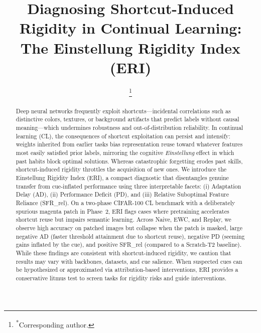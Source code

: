 \documentclass[conference]{IEEEtran}
\begin{document}
\title{Diagnosing Shortcut-Induced Rigidity in Continual Learning: The Einstellung Rigidity Index (ERI)}

\author{
  \thanks{\textsuperscript{*}Corresponding author.}
}

\maketitle

\begin{abstract}
Deep neural networks frequently exploit shortcuts---incidental correlations such as distinctive colors, textures, or background artifacts that predict labels without causal meaning---which undermines robustness and out-of-distribution reliability. In continual learning (CL), the consequences of shortcut exploitation can persist and intensify: weights inherited from earlier tasks bias representation reuse toward whatever features most easily satisfied prior labels, mirroring the cognitive \emph{Einstellung} effect in which past habits block optimal solutions. Whereas catastrophic forgetting erodes past skills, shortcut-induced rigidity throttles the acquisition of new ones. We introduce the Einstellung Rigidity Index (ERI), a compact diagnostic that disentangles genuine transfer from cue-inflated performance using three interpretable facets: (i) Adaptation Delay (AD), (ii) Performance Deficit (PD), and (iii) Relative Suboptimal Feature Reliance (SFR\_rel). On a two-phase CIFAR-100 CL benchmark with a deliberately spurious magenta patch in Phase~2, ERI flags cases where pretraining accelerates shortcut reuse but impairs semantic learning. Across Naive, EWC, and Replay, we observe high accuracy on patched images but collapse when the patch is masked, large negative AD (faster threshold attainment due to shortcut reuse), negative PD (seeming gains inflated by the cue), and positive SFR\_rel (compared to a Scratch-T2 baseline). While these findings are consistent with shortcut-induced rigidity, we caution that results may vary with backbones, datasets, and cue salience. When suspected cues can be hypothesized or approximated via attribution-based interventions, ERI provides a conservative litmus test to screen tasks for rigidity risks and guide interventions.
\end{abstract}
\end{document}
